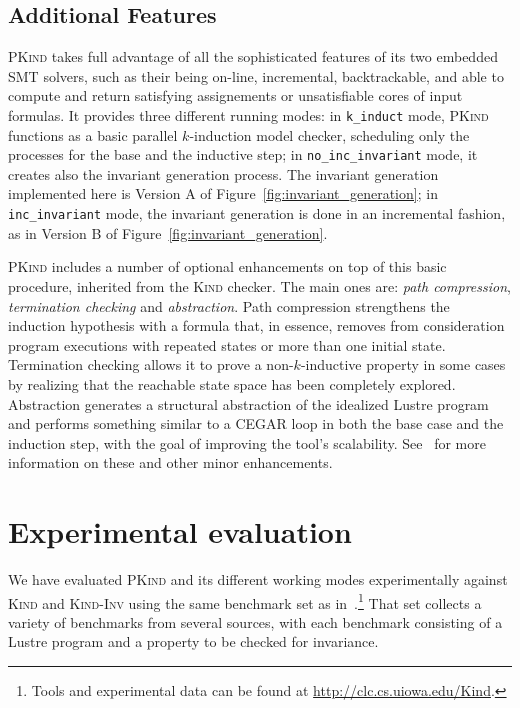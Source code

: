 \documentclass[submission,copyright,creativecommons]{eptcs}
\newcommand{\Kind}{\textrm{\textsc{Kind}}\xspace}
\newcommand{\KindInv}{\textrm{\textsc{Kind}-\textsc{Inv}}\xspace}
\newcommand{\PKind}{\textrm{\textsc{PKind}}\xspace}
\begin{document}
\subsection{Additional Features}


\PKind takes full advantage of all the sophisticated features of its
two embedded SMT solvers, such as their being on-line, incremental,
backtrackable, and able to compute and return satisfying assignements
or unsatisfiable cores of input formulas.  
It provides three
different running modes:
in \texttt{\small k\_induct} mode, \PKind
functions as a basic parallel $k$-induction model checker, scheduling
only the processes for the base and the inductive step;
in
\texttt{\small no\_inc\_invariant} mode, it creates also the invariant
generation process. The invariant generation implemented here is
Version A of Figure~\ref{fig:invariant_generation};
in \texttt{\small
  inc\_invariant} mode, the invariant generation is done in an
incremental fashion, as in Version B of
Figure~\ref{fig:invariant_generation}.

\PKind includes a number of optional enhancements on top of this basic
procedure,
inherited from the \Kind checker.
The main ones are: \textit{path compression},
\textit{termination checking} and \textit{abstraction}.  Path
compression strengthens the induction hypothesis with a formula that,
in essence, removes from consideration program executions with
repeated states or more than one initial state.  Termination checking
allows it to prove a non-$k$-inductive property in some
cases by realizing that the reachable state space has been completely
explored.  Abstraction generates a structural abstraction of the
idealized Lustre program and performs something similar to a CEGAR
loop in both the base case and the induction step, with the goal of
improving the tool's scalability.  
See~\cite{hagen08} for more
information on these and other minor enhancements.

\vspace{-0.4cm}
\section{Experimental evaluation}

We have evaluated \PKind and its different working modes experimentally
against \Kind and \KindInv
using the same benchmark set as in~\cite{Kahsai-Ge-Tinelli-10}.\footnote{ Tools and experimental data can be found at
  \url{http://clc.cs.uiowa.edu/Kind}.} 
That set collects a variety of benchmarks from several sources,
with each benchmark consisting of a Lustre program 
and a property to be checked for invariance.
\end{document}
